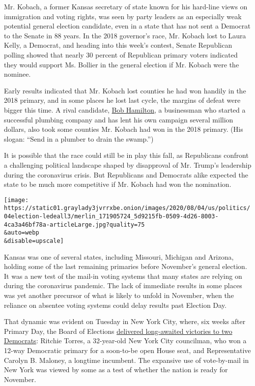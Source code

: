 Mr. Kobach, a former Kansas secretary of state known for his hard-line
views on immigration and voting rights, was seen by party leaders as an
especially weak potential general election candidate, even in a state
that has not sent a Democrat to the Senate in 88 years. In the 2018
governor's race, Mr. Kobach lost to Laura Kelly, a Democrat, and heading
into this week's contest, Senate Republican polling showed that nearly
30 percent of Republican primary voters indicated they would support Ms.
Bollier in the general election if Mr. Kobach were the nominee.

Early results indicated that Mr. Kobach lost counties he had won handily
in the 2018 primary, and in some places he lost last cycle, the margins
of defeat were bigger this time. A rival candidate,
\href{https://www.kansascity.com/news/politics-government/article244374532.html}{Bob
Hamilton}, a businessman who started a successful plumbing company and
has lent his own campaign several million dollars, also took some
counties Mr. Kobach had won in the 2018 primary. (His slogan: ``Send in
a plumber to drain the swamp.'')

It is possible that the race could still be in play this fall, as
Republicans confront a challenging political landscape shaped by
disapproval of Mr. Trump's leadership during the coronavirus crisis. But
Republicans and Democrats alike expected the state to be much more
competitive if Mr. Kobach had won the nomination.

\texttt{[image: https://static01.graylady3jvrrxbe.onion/images/2020/08/04/us/politics/04election-ledeall3/merlin\_171905724\_5d9215fb-0509-4d26-8003-4ca3a46bf78a-articleLarge.jpg?quality=75\\\&auto=webp\\\&disable=upscale]}

Kansas was one of several states, including Missouri, Michigan and
Arizona, holding some of the last remaining primaries before November's
general election. It was a new test of the mail-in voting systems that
many states are relying on during the coronavirus pandemic. The lack of
immediate results in some places was yet another precursor of what is
likely to unfold in November, when the reliance on absentee voting
systems could delay results past Election Day.

That dynamic was evident on Tuesday in New York City, where, six weeks
after Primary Day, the Board of Elections
\href{https://www.nytimes3xbfgragh.onion/2020/08/04/nyregion/maloney-torres-ny-congressional-races.html}{delivered
long-awaited victories to two Democrats}: Ritchie Torres, a 32-year-old
New York City councilman, who won a 12-way Democratic primary for a
soon-to-be open House seat, and Representative Carolyn B. Maloney, a
longtime incumbent. The expansive use of vote-by-mail in New York was
viewed by some as a test of whether the nation is ready for November.

